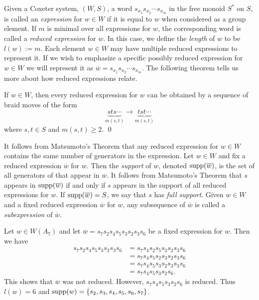 Given a Coxeter system, $(W,S)$, a word $s_{x_1}s_{x_2} \cdots s_{x_m}$ in the free monoid $S^*$ on $S$, is called an \emph{expression} for $w \in W$ if it is equal to $w$ when considered as a group element. If $m$ is minimal over all expressions for $w$, the corresponding word is called a \emph{reduced expression} for $w$. In this case, we define the \emph{length} of $w$ to be $l(w):= m$. Each element $w \in W$ may have multiple reduced expressions to represent it. If we wish to emphasize a specific possibly reduced expression for $w \in W$ we will represent it as $\overline{w}=s_{x_1}s_{x_2}\cdots s_{x_m}.$ The following theorem tells us more about how reduced expressions relate.

\begin{theorem} 
	If $w \in W$, then every reduced expression for $w$ can be obtained by a sequence of braid moves of the form
	\[\underbrace{sts\cdots}_{m(s,t)} \rightarrow \underbrace{tst\cdots}_{m(s,t)}\]
	where $s,t \in S$ and $m(s,t) \geq 2$. \qed
\end{theorem}
 
It follows from Matsumoto's Theorem that any reduced expression for $w \in W$ contains the same number of generators in the expression. Let $w \in W$ and fix a reduced expression $\overline{w}$ for $w$. Then the \emph{support} of $w$, denoted $\mathrm{supp}(\overline{w})$, is the set of all generators of that appear in $\overline{w}$. It follows from Matsumoto's Theorem that $s$ appears in $\mathrm{supp}(\overline{w})$ if and only if $s$ appears in the support of all reduced expressions for $w$. If $\mathrm{supp}(\overline{w})=S$, we say that $s$ has \emph{full support}. Given $w \in W$ and a fixed reduced expression $\overline{w}$ for $w$, any subsequence of $\overline{w}$ is called a \emph{subexpression} of $\overline{w}$. \\

\begin{example}
Let $w \in W(A_7)$ and let $\overline{w}=s_7s_2s_4s_5s_3s_2s_3s_6$ be a fixed expression for $w$. Then we have
\begin{align*}
s_7s_2s_4s_5s_3s_2s_3s_6&=s_7s_4s_2s_5s_3s_2s_3s_6\\
&=s_7s_4s_5s_2s_3s_2 s_3s_6\\
&=s_7s_4s_5s_3s_2s_3s_3s_6\\
&=s_7s_4s_5s_3s_2s_6.
\end{align*}
This shows that $\overline{w}$ was not reduced. However, $s_7s_4s_5s_3s_2s_6$ is reduced. Thus $l(w)=6$ and $\mathrm{supp}(w)=\{s_2, s_3, s_4, s_5, s_6, s_7\}$.
\end{example}

